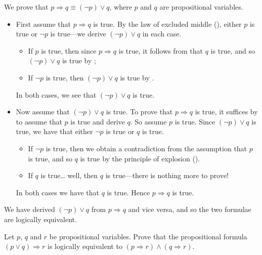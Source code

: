 \begin{example}
\label{exImplicationInTermsOfDisjunction}
We prove that $p \Rightarrow q \equiv (\neg p) \vee q$, where $p$ and $q$ are propositional variables.

\begin{itemize}
\item First assume that $p \Rightarrow q$ is true. By the law of excluded middle (), either $p$ is true or $\neg p$ is true---we derive $(\neg p) \vee q$ in each case.
\begin{itemize}
\item If $p$ is true, then since $p \Rightarrow q$ is true, it follows from \elimrule{\Rightarrow} that $q$ is true, and so $(\neg p) \vee q$ is true by ;
\item If $\neg p$ is true, then $(\neg p) \vee q$ is true by .
\end{itemize}
In both cases, we see that $(\neg p) \vee q$ is true.

\item Now assume that $(\neg p) \vee q$ is true. To prove that $p \Rightarrow q$ is true, it suffices by \introrule{\Rightarrow} to assume that $p$ is true and derive $q$. So assume $p$ is true. Since $(\neg p) \vee q$ is true, we have that either $\neg p$ is true or $q$ is true.
\begin{itemize}
\item If $\neg p$ is true, then we obtain a contradiction from the assumption that $p$ is true, and so $q$ is true by the principle of explosion ().
\item If $q$ is true\dots{} well, then $q$ is true---there is nothing more to prove!
\end{itemize}
In both cases we have that $q$ is true. Hence $p \Rightarrow q$ is true.
\end{itemize}

We have derived $(\neg p) \vee q$ from $p \Rightarrow q$ and vice versa, and so the two formulae are logically equivalent.
\end{example}

\begin{exercise}
\label{exPAndQImpliesRIffPImpliesRAndQImpliesR}
Let $p$, $q$ and $r$ be propositional variables. Prove that the propositional formula $(p \vee q) \Rightarrow r$ is logically equivalent to $(p \Rightarrow r) \wedge (q \Rightarrow r)$.
\end{exercise}

